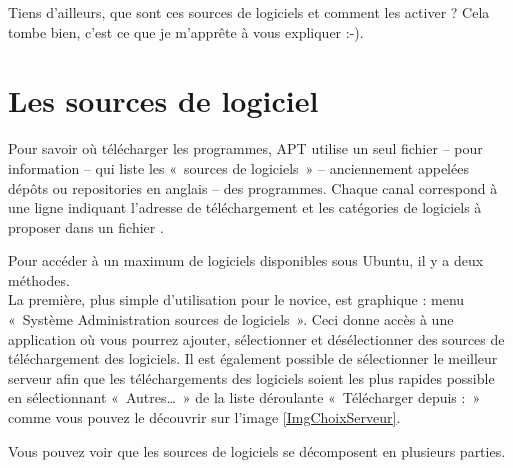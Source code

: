 {\begin{nota}
Tiens d'ailleurs, que sont ces sources de logiciels et comment les activer ? Cela tombe bien, c'est ce que je m'apprête à vous expliquer :-).
\end{nota}
\section{Les sources de logiciel}
\label{RefSourceMAJ}
Pour savoir où télécharger les programmes, APT utilise un seul fichier --  pour information -- qui liste les «~sources de logiciels~» -- anciennement appelées dépôts ou repositories en anglais -- des programmes. Chaque canal correspond à une ligne indiquant l'adresse de téléchargement et les catégories de logiciels à proposer dans un fichier .\par
Pour accéder à un maximum de logiciels disponibles sous Ubuntu, il y a deux méthodes.\\
La première, plus simple d'utilisation pour le novice, est graphique : menu «~Système \FlecheDroite Administration \FlecheDroite sources de logiciels~». Ceci donne accès à une application où vous pourrez ajouter, sélectionner et désélectionner des sources de téléchargement des logiciels. Il est également possible de sélectionner le meilleur serveur afin que les téléchargements des logiciels soient les plus rapides possible en sélectionnant «~Autres\ldots{}~» de la liste déroulante «~Télécharger depuis :~» comme vous pouvez le découvrir sur l'image \ref{ImgChoixServeur}.\par
{}
Vous pouvez voir que les sources de logiciels se décomposent en plusieurs parties.
}
